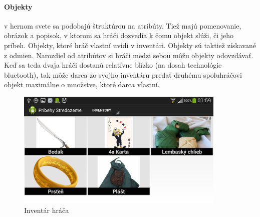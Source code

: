 \paragraph{Objekty} v hernom svete sa podobajú štruktúrou na atribúty. Tiež majú pomenovanie, obrázok a popisok, v ktorom sa hráči dozvedia k čomu objekt slúži, či jeho príbeh. Objekty, ktoré hráč vlastní uvidí v inventári. Objekty sú taktiež získavané z odmien. Narozdiel od atribútov si hráči medzi sebou môžu objekty odovzdávať. Keď sa teda dvaja hráči dostanú relatívne blízko (na dosah technológie bluetooth), tak môže darca zo svojho inventáru predať druhému spoluhráčovi objekt maximálne o množstve, ktoré darca vlastní.
\begin{figure}[ht!]
  \centering
  \includegraphics[width=10cm]{mainmatter/imgs/klient_inventory2.png}
  \caption{Inventár hráča}
  \label{fig:klient_inventory}
\end{figure}



